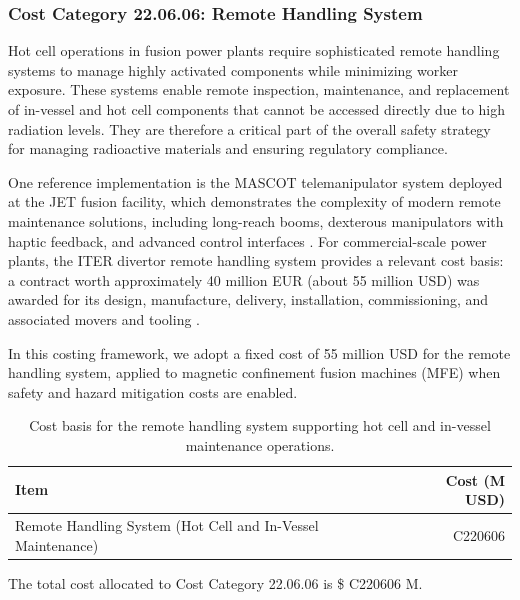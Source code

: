\ifsafetycosts
\subsubsection*{Cost Category 22.06.06: Remote Handling System}

Hot cell operations in fusion power plants require sophisticated remote handling systems to manage highly activated components while minimizing worker exposure. These systems enable remote inspection, maintenance, and replacement of in-vessel and hot cell components that cannot be accessed directly due to high radiation levels. They are therefore a critical part of the overall safety strategy for managing radioactive materials and ensuring regulatory compliance.

One reference implementation is the MASCOT telemanipulator system deployed at the JET fusion facility, which demonstrates the complexity of modern remote maintenance solutions, including long-reach booms, dexterous manipulators with haptic feedback, and advanced control interfaces \cite{Hamilton2001Mascot}. For commercial-scale power plants, the ITER divertor remote handling system provides a relevant cost basis: a contract worth approximately 40 million EUR (about 55 million USD) was awarded for its design, manufacture, delivery, installation, commissioning, and associated movers and tooling \cite{IterRemoteHandlingWNN}.

In this costing framework, we adopt a fixed cost of 55 million USD for the remote handling system, applied to magnetic confinement fusion machines (MFE) when safety and hazard mitigation costs are enabled.

\begin{table}[ht]
    \centering
    \begin{tabular}{lr}
        \hline
        \textbf{Item} & \textbf{Cost (M USD)} \\ \hline
        Remote Handling System (Hot Cell and In-Vessel Maintenance) & C220606 \\ \hline
    \end{tabular}
    \caption{Cost basis for the remote handling system supporting hot cell and in-vessel maintenance operations.}
    \label{tab:cas220606-cost}
\end{table}

The total cost allocated to Cost Category 22.06.06 is \$ C220606 M.
\fi

